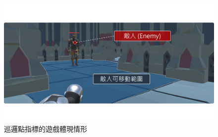 \begin{figure}[!htb]
  \begin{center}
    \includegraphics[width=1.0\textwidth]{figures/fitnesses-patrol-gameplay.pdf}
    \caption{巡邏點指標的遊戲體現情形}
    \label{fig:fitnesses-patrol-gameplay}
  \end{center}
\end{figure}






